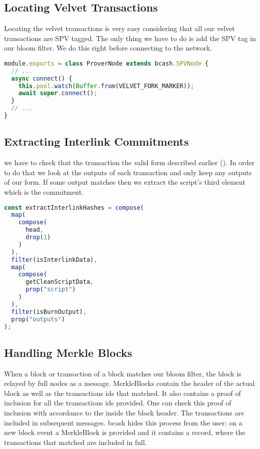 \subsection{Locating Velvet Transactions}
Locating the velvet transactions is very easy considering that all our velvet transactions are SPV tagged. The only thing we have to do is add the SPV tag in our bloom filter. We do this right before connecting to the network.

\begin{lstlisting}[language=Javascript]
module.exports = class ProverNode extends bcash.SPVNode {
  // ...
  async connect() {
    this.pool.watch(Buffer.from(VELVET_FORK_MARKER));
    await super.connect();
  }
  // ...
}
\end{lstlisting}

\subsection{Extracting Interlink Commitments}
we have to check that the transaction the valid form described earlier (). In order to do that we look at the outputs of each transaction and only keep any outputs of our form. If some output matches then we extract the script's third element which is the commitment.

\begin{lstlisting}[language=Javascript]
const extractInterlinkHashes = compose(
  map(
    compose(
      head,
      drop(1)
    )
  ),
  filter(isInterlinkData),
  map(
    compose(
      getCleanScriptData,
      prop("script")
    )
  ),
  filter(isBurnOutput),
  prop("outputs")
);
\end{lstlisting}

\subsection{Handling Merkle Blocks}
When a block or transaction of a block matches our bloom filter, the block is relayed by full nodes as a  message. MerkleBlocks contain the header of the actual block as well as the transactions ids that matched. It also contains a proof of inclusion for all the transactions ids provided. One can check this proof of inclusion with accordance to the  inside the block header. The transactions are included in subsequent  messages. bcash hides this process from the user: on a new block event a MerkleBlock is provided and it contains a  record, where the transactions that matched are included in full.

